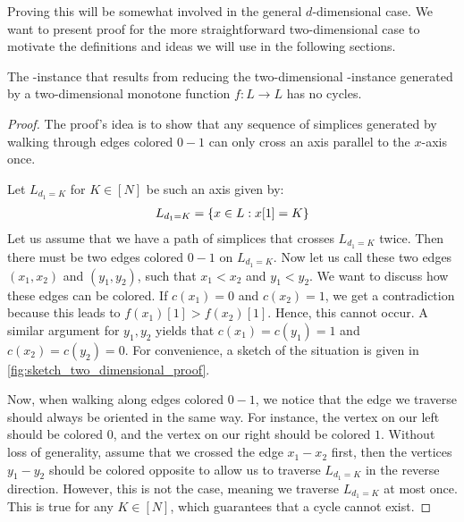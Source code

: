 Proving this will be somewhat involved in the general $d$-dimensional case. We want to present proof for the more straightforward two-dimensional case to motivate the definitions and ideas we will use in the following sections.

\begin{proposition}
	The \EndOfLine-instance that results from reducing the two-dimensional \Sperner-instance generated by a two-dimensional monotone function $f : L \rightarrow L$ has no cycles.
\end{proposition}
\begin{proof}
	The proof's idea is to show that any sequence of simplices generated by walking through edges colored $0 - 1$ can only cross an axis parallel to the $x$-axis once.

	Let $L_{d_1= K}$ for $K \in [N]$ be such an axis given by:
	\begin{align*}
		L_{d_1=K} = \left\{x \in L : x[1] = K\right\}
	\end{align*}
	Let us assume that we have a path of simplices that crosses $L_{d_1 = K}$ twice. Then there must be two edges colored $0 - 1$ on $L_{d_1=K}$. Now let us call these two edges $(x_1, x_2)$ and $(y_1, y_2)$, such that $x_1 < x_2$ and $y_1 < y_2$. We want to discuss how these edges can be colored. If $c(x_1) = 0$ and $c(x_2) = 1$, we get a contradiction because this leads to $f(x_1)[1] > f(x_2)[1]$. Hence, this cannot occur. A similar argument for $y_1, y_2$ yields that $c(x_1) = c(y_1) =1$ and $c(x_2) = c(y_2) = 0$. For convenience, a sketch of the situation is given in \cref{fig:sketch_two_dimensional_proof}.

	Now, when walking along edges colored $0 - 1$, we notice that the edge we traverse should always be oriented in the same way. For instance, the vertex on our left should be colored $0$, and the vertex on our right should be colored $1$. Without loss of generality, assume that we crossed the edge $x_1 - x_2$ first, then the vertices $y_1 - y_2$ should be colored opposite to allow us to traverse $L_{d_1=K}$ in the reverse direction. However,  this is not the case, meaning we traverse $L_{d_1=K}$ at most once. This is true for any $K \in [N]$, which guarantees that a cycle cannot exist.
\end{proof}
\begin{marginfigure}[-30mm]
	\caption{Sketch of the setting for the two-dimensional proof}
	\label{fig:sketch_two_dimensional_proof}
\end{marginfigure}

